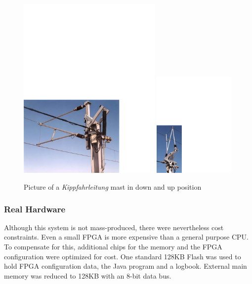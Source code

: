 \begin{figure}
    \centering
    \includegraphics[width=7cm]{results/results_kfl_mast1}
    \hspace{1cm}
    \includegraphics[width=4cm]{results/results_kfl_mast2}
    \caption{Picture of a \emph{Kippfahrleitung} mast in down and up position}
    \label{fig:results:kfl:mast}
\end{figure}



\subsubsection{Real Hardware}

Although this system is not mass-produced, there were nevertheless
cost constraints. Even a small FPGA is more expensive than a general
purpose CPU. To compensate for this, additional chips for the memory
and the FPGA configuration were optimized for cost. One standard
128KB Flash was used to hold FPGA configuration data, the Java
program and a logbook. External main memory was reduced to 128KB
with an 8-bit data bus.


